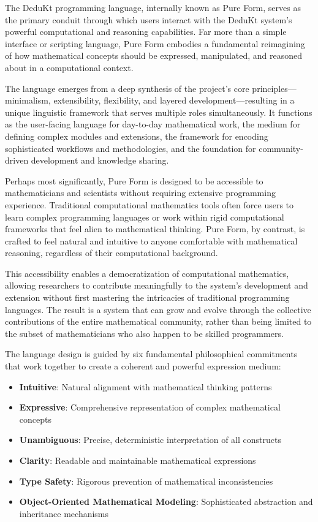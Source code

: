 The DeduKt programming language, internally known as Pure Form, serves as the primary conduit through which users interact with the DeduKt system's powerful computational and reasoning capabilities.
Far more than a simple interface or scripting language, Pure Form embodies a fundamental reimagining of how mathematical concepts should be expressed, manipulated, and reasoned about in a computational context.

The language emerges from a deep synthesis of the project's core principles—minimalism, extensibility, flexibility, and layered development—resulting in a unique linguistic framework that serves multiple roles simultaneously.
It functions as the user-facing language for day-to-day mathematical work, the medium for defining complex modules and extensions, the framework for encoding sophisticated workflows and methodologies, and the foundation for community-driven development and knowledge sharing.

Perhaps most significantly, Pure Form is designed to be accessible to mathematicians and scientists without requiring extensive programming experience.
Traditional computational mathematics tools often force users to learn complex programming languages or work within rigid computational frameworks that feel alien to mathematical thinking.
Pure Form, by contrast, is crafted to feel natural and intuitive to anyone comfortable with mathematical reasoning, regardless of their computational background.

This accessibility enables a democratization of computational mathematics, allowing researchers to contribute meaningfully to the system's development and extension without first mastering the intricacies of traditional programming languages.
The result is a system that can grow and evolve through the collective contributions of the entire mathematical community, rather than being limited to the subset of mathematicians who also happen to be skilled programmers.

The language design is guided by six fundamental philosophical commitments that work together to create a coherent and powerful expression medium:

\begin{itemize}
    \item \textbf{Intuitive}: Natural alignment with mathematical thinking patterns
    \item \textbf{Expressive}: Comprehensive representation of complex mathematical concepts
    \item \textbf{Unambiguous}: Precise, deterministic interpretation of all constructs
    \item \textbf{Clarity}: Readable and maintainable mathematical expressions
    \item \textbf{Type Safety}: Rigorous prevention of mathematical inconsistencies
    \item \textbf{Object-Oriented Mathematical Modeling}: Sophisticated abstraction and inheritance mechanisms
\end{itemize}

